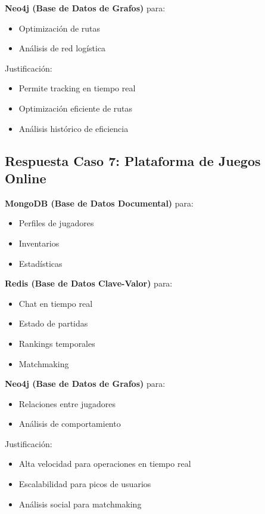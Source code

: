 \documentclass[12pt]{article}
\begin{document}
\textbf{Neo4j (Base de Datos de Grafos)} para:
\begin{itemize}
    \item Optimización de rutas
    \item Análisis de red logística
\end{itemize}

Justificación:
\begin{itemize}
    \item Permite tracking en tiempo real
    \item Optimización eficiente de rutas
    \item Análisis histórico de eficiencia
\end{itemize}

\subsection{Respuesta Caso 7: Plataforma de Juegos Online}

\textbf{MongoDB (Base de Datos Documental)} para:
\begin{itemize}
    \item Perfiles de jugadores
    \item Inventarios
    \item Estadísticas
\end{itemize}

\textbf{Redis (Base de Datos Clave-Valor)} para:
\begin{itemize}
    \item Chat en tiempo real
    \item Estado de partidas
    \item Rankings temporales
    \item Matchmaking
\end{itemize}

\textbf{Neo4j (Base de Datos de Grafos)} para:
\begin{itemize}
    \item Relaciones entre jugadores
    \item Análisis de comportamiento
\end{itemize}

Justificación:
\begin{itemize}
    \item Alta velocidad para operaciones en tiempo real
    \item Escalabilidad para picos de usuarios
    \item Análisis social para matchmaking
\end{itemize}
\end{document}
